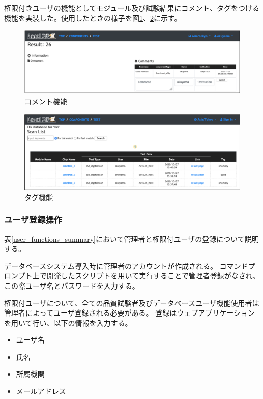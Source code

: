 権限付きユーザの機能としてモジュール及び試験結果にコメント、タグをつける機能を実装した。使用したときの様子を図\ref{webapp_comment}、\ref{webapp_tag}に示す。

\begin{figure}[bpt]\centering
\includegraphics[width=12cm]{viewer_comment}
\caption[コメント機能]{コメント機能}
\label{webapp_comment}
\end{figure}

\begin{figure}[bpt]\centering
\includegraphics[width=12cm]{viewer_tag}
\caption[タグ機能]{タグ機能}
\label{webapp_tag}
\end{figure}

\subsubsection{ユーザ登録操作}
表\ref{user_functions_summary}において管理者と権限付ユーザの登録について説明する。

データベースシステム導入時に管理者のアカウントが作成される。
コマンドプロンプト上で開発したスクリプトを用いて実行することで管理者登録がなされ、この際ユーザ名とパスワードを入力する。

権限付ユーザについて、全ての品質試験者及びデータベースユーザ機能使用者は管理者によってユーザ登録される必要がある。
登録はウェブアプリケーションを用いて行い、以下の情報を入力する。
\begin{itemize}
  \item ユーザ名 
  \item 氏名
  \item 所属機関
  \item メールアドレス 
\end{itemize}

